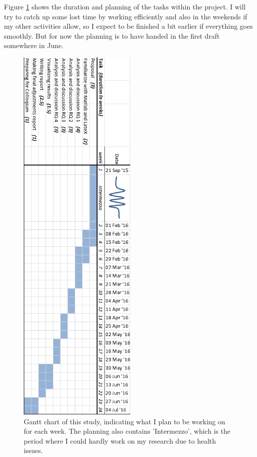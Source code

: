 \documentclass{article}
\begin{document}
Figure \ref{fig:planning} shows the duration and planning of the tasks within the project. I will try to catch up some lost time by working efficiently and also in the weekends if my other activities allow, so I expect to be finished a bit earlier if everything goes smoothly. But for now the planning is to have handed in the first draft somewhere in June.

\begin{figure}[H]
	\centering
	\includegraphics[height=7.5in]{figures/Planning.png}
	\caption[Optional caption]{Gantt chart of this study, indicating what I plan to be working on for each week. The planning also contains 'Intermezzo', which is the period where I could hardly work on my research due to health issues.}
	\label{fig:planning}
\end{figure}


\newpage
\end{document}
